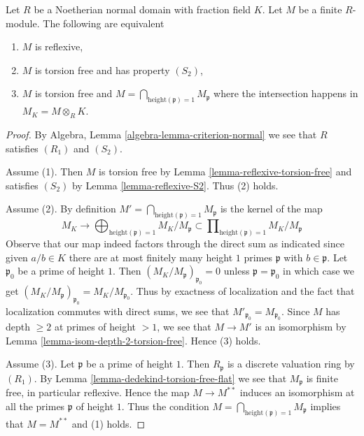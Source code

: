 \begin{lemma}
\label{lemma-reflexive-over-normal}
Let $R$ be a Noetherian normal domain with fraction field $K$.
Let $M$ be a finite $R$-module. The following are equivalent
\begin{enumerate}
\item $M$ is reflexive,
\item $M$ is torsion free and has property $(S_2)$,
\item $M$ is torsion free and
$M = \bigcap_{\text{height}(\mathfrak p) = 1} M_{\mathfrak p}$
where the intersection happens in $M_K = M \otimes_R K$.
\end{enumerate}
\end{lemma}

\begin{proof}
By Algebra, Lemma \ref{algebra-lemma-criterion-normal}
we see that $R$ satisfies $(R_1)$ and $(S_2)$.

\medskip\noindent
Assume (1). Then $M$ is torsion free by Lemma \ref{lemma-reflexive-torsion-free}
and satisfies $(S_2)$ by Lemma \ref{lemma-reflexive-S2}.
Thus (2) holds.

\medskip\noindent
Assume (2). By definition
$M' = \bigcap_{\text{height}(\mathfrak p) = 1} M_{\mathfrak p}$
is the kernel of the map
$$
M_K
\longrightarrow
\bigoplus\nolimits_{\text{height}(\mathfrak p) = 1} M_K/M_\mathfrak p
\subset
\prod\nolimits_{\text{height}(\mathfrak p) = 1} M_K/M_\mathfrak p
$$
Observe that our map indeed factors through the direct sum as indicated
since given
$a/b \in K$ there are at most finitely many height $1$ primes $\mathfrak p$
with $b \in \mathfrak p$. Let $\mathfrak p_0$ be a prime of height $1$.
Then $(M_K/M_\mathfrak p)_{\mathfrak p_0} = 0$ unless
$\mathfrak p = \mathfrak p_0$ in which case we get
$(M_K/M_\mathfrak p)_{\mathfrak p_0} = M_K/M_{\mathfrak p_0}$.
Thus by exactness of localization and the fact that localization
commutes with direct sums, we see that
$M'_{\mathfrak p_0} = M_{\mathfrak p_0}$.
Since $M$ has depth $\geq 2$ at primes of height $> 1$,
we see that $M \to M'$ is an isomorphism by
Lemma \ref{lemma-isom-depth-2-torsion-free}. Hence (3) holds.

\medskip\noindent
Assume (3). Let $\mathfrak p$ be a prime of height $1$.
Then $R_\mathfrak p$ is a discrete valuation ring by $(R_1)$.
By Lemma \ref{lemma-dedekind-torsion-free-flat}
we see that $M_\mathfrak p$ is finite free, in particular
reflexive. Hence the map $M \to M^{**}$ induces an isomorphism at all
the primes $\mathfrak p$ of height $1$. Thus the condition
$M = \bigcap_{\text{height}(\mathfrak p) = 1} M_{\mathfrak p}$
implies that $M = M^{**}$ and (1) holds.
\end{proof}